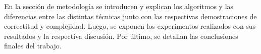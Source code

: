 En la sección de metodología se introducen y explican los algoritmos y las diferencias entre las distintas técnicas junto con las respectivas demostraciones de correctitud y complejidad. Luego, se exponen los experimentos realizados con sus resultados y la respectiva discusión. Por último, se detallan las conclusiones finales del trabajo.
